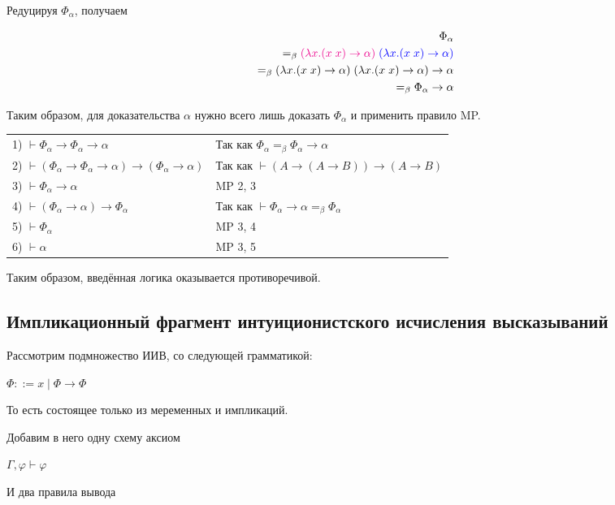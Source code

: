 Редуцируя $\Phi_{\alpha}$, получаем 

\begin{align*}
\Phi_{\alpha} \\ =_{\beta} \textcolor{magenta}{(\lambda x. (x \; x) \rightarrow \alpha)} \; \textcolor{blue}{(\lambda x. (x \; x) \rightarrow \alpha)} \\=_{\beta} (\lambda x. (x \; x) \rightarrow \alpha) \; (\lambda x. (x \; x) \rightarrow \alpha) \rightarrow \alpha \\=_{\beta} \Phi_{\alpha} \rightarrow \alpha
\end{align*}

Таким образом, для доказательства $\alpha$ нужно всего лишь доказать $\Phi_{\alpha}$ и применить правило MP.

\begin{tabular}{ll}
	1) $\vdash\Phi_\alpha\rightarrow\Phi_\alpha\rightarrow\alpha$ & Так как $\Phi_{\alpha} =_{\beta} \Phi_{\alpha} \rightarrow \alpha$\\
	2) $\vdash(\Phi_\alpha\rightarrow\Phi_\alpha\rightarrow\alpha)\rightarrow(\Phi_\alpha\rightarrow\alpha)$ & Так как $\vdash (A \rightarrow (A \rightarrow B)) \rightarrow (A \rightarrow B)$\\
	3) $\vdash\Phi_\alpha\rightarrow\alpha$ & MP 2, 3\\
	4) $\vdash (\Phi_\alpha \rightarrow \alpha) \rightarrow \Phi_\alpha$ & Так как $\vdash \Phi_\alpha \rightarrow \alpha =_{\beta} \Phi_\alpha$\\
	5) $\vdash\Phi_\alpha$ & MP 3, 4\\
	6) $\vdash\alpha$ & MP 3, 5
\end{tabular}

Таким образом, введённая логика оказывается противоречивой.

\subsection{Импликационный фрагмент интуиционистского исчисления высказываний}

Рассмотрим подмножество ИИВ, со следующей грамматикой:

$\Phi ::= x \; | \; \Phi \rightarrow \Phi$

То есть состоящее только из меременных и импликаций. 

Добавим в него одну схему аксиом

$\Gamma, \varphi \vdash \varphi$

И два правила вывода

